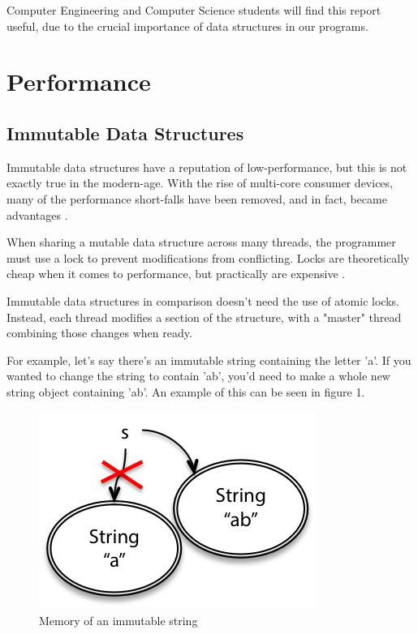 \documentclass[11pt]{article}
\begin{document}
Computer Engineering and Computer Science students will find this report useful,
due to the crucial importance of data structures in our programs.
\clearpage

\section{Performance}
\subsection{Immutable Data Structures}
Immutable data structures have a reputation of low-performance, but this is not
exactly true in the modern-age. With the rise of multi-core consumer devices,
many of the performance short-falls have been removed, and in fact, became
advantages \cite{slaks}.

When sharing a mutable data structure across many threads, the programmer must
use a lock to prevent modifications from conflicting. Locks are theoretically
cheap when it comes to performance, but practically are expensive
\cite{attractive_chaos}.

Immutable data structures in comparison doesn't need the use of atomic locks.
Instead, each thread modifies a section of the structure, with a "master"
thread combining those changes when ready.

For example, let's say there's an immutable string containing the letter 'a'.
If you wanted to change the string to contain 'ab', you'd need to make a whole
new string object containing 'ab'. An example of this can be seen in figure 1.

\begin{figure}[H]
\centering

\includegraphics{immutable_string}
\caption{Memory of an immutable string \cite{mit_reading_9}}

\end{figure}
\end{document}
